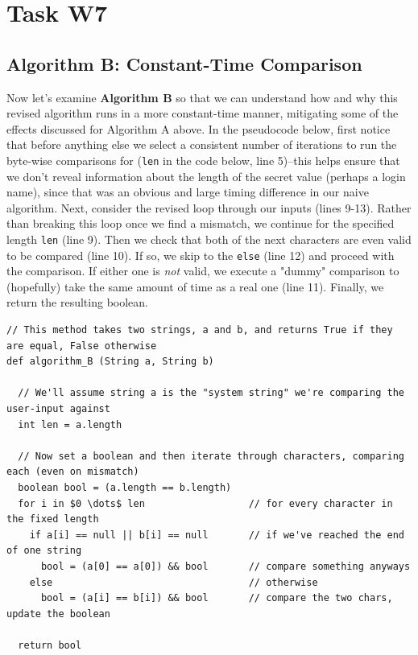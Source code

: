 \documentclass{article}
\providecommand{\inlinecode}{\texttt}
\begin{document}
\pagebreak

\section{Task W7}
\subsection{Algorithm B: Constant-Time Comparison}
Now let's examine \textbf{Algorithm B} so that we can understand how and why this revised algorithm runs in a more constant-time manner, mitigating some of the effects discussed for Algorithm A above.
In the pseudocode below, first notice that before anything else we select a consistent number of iterations to run the byte-wise comparisons for (\inlinecode{len} in the code below, line 5)--this helps ensure that we don't reveal information about the length of the secret value (perhaps a login name), since that was an obvious and large timing difference in our naive algorithm.
Next, consider the revised loop through our inputs (lines 9-13). Rather than breaking this loop once we find a mismatch, we continue for the specified length \inlinecode{len} (line 9).
Then we check that both of the next characters are even valid to be compared (line 10). If so, we skip to the \inlinecode{else} (line 12) and proceed with the comparison. If either one is \textit{not} valid, we execute a "dummy" comparison to (hopefully) take the same amount of time as a real one (line 11).
Finally, we return the resulting boolean.

\begin{lstlisting}
// This method takes two strings, a and b, and returns True if they are equal, False otherwise
def algorithm_B (String a, String b)

  // We'll assume string a is the "system string" we're comparing the user-input against
  int len = a.length

  // Now set a boolean and then iterate through characters, comparing each (even on mismatch)
  boolean bool = (a.length == b.length)
  for i in $0 \dots$ len                  // for every character in the fixed length
    if a[i] == null || b[i] == null       // if we've reached the end of one string
      bool = (a[0] == a[0]) && bool       // compare something anyways
    else                                  // otherwise
      bool = (a[i] == b[i]) && bool       // compare the two chars, update the boolean

  return bool
\end{lstlisting}
\end{document}
